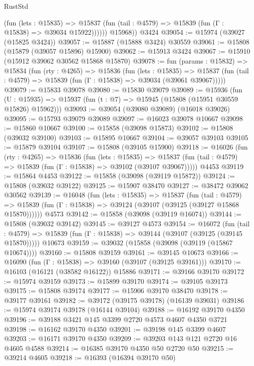 \begin{lexlean}{RustStd}
\begin{coremodule}
              (fun (lets : @15835) =>
              @15837 (fun (tail : @4579) => @15839 (fun (Γ : @15838) => @39034 @15922))))))
        @15968))
    @3424
@39054 := @15974 (@39027 (@15825 @3424))
@39057 := @15887 (@15888 @3424) @30559
@39061 := @15808 (@15879 (@39057 @15896) @15900)
@39062 := @15913 @3424
@39067 := @15910 (@15912 @39062 @30562 @15868 @15870)
@39078 := fun (params : @15832) =>
  @15834
    (fun (rty : @4265) =>
    @15836
      (fun (lets : @15835) =>
      @15837 (fun (tail : @4579) => @15839 (fun (Γ : @15838) => @39034 (@39061 @39067)))))
@39079 := @15833 @39078
@39080 := @15830 @39079
@39089 := @15936
    (fun (U : @15935) => @15937 (fun (t : @7) => @15945 (@15808 (@15951 @30559 @15826) @15962)))
@39093 := @39054 (@39080 @39089) (@16018 @39026)
@39095 := @15793 @39079 @39089
@39097 := @16023 @39078 @10667
@39098 := @15860 @10667
@39100 := @15858 (@39098 @15873)
@39102 := @15808 (@39032 @39100)
@39103 := @15895 @10667
@39104 := @39057 @39103
@39105 := @15879 @39104
@39107 := @15808 (@39105 @15900)
@39118 := @16026
    (fun (rty : @4265) =>
    @15836
      (fun (lets : @15835) =>
      @15837 (fun (tail : @4579) => @15839 (fun (Γ : @15838) => @39102 (@39107 @39067)))))
    @4453
@39119 := @15864 @4453
@39122 := @15858 (@39098 (@39119 @15872))
@39124 := @15808 (@39032 @39122)
@39125 := @15907 @38470
@39127 := @38472 @39062 @30562
@39139 := @16048
    (fun (lets : @15835) =>
    @15837
      (fun (tail : @4579) =>
      @15839 (fun (Γ : @15838) => @39124 (@39107 (@39125 (@39127 @15868 @15870))))))
    @4573
@39142 := @15858 (@39098 (@39119 @16074))
@39144 := @15808 (@39032 @39142)
@39145 := @39127 @4573
@39154 := @16072
    (fun (tail : @4579) => @15839 (fun (Γ : @15838) => @39144 (@39107 (@39125 (@39145 @15870)))))
    @10673
@39159 := @39032 (@15858 (@39098 (@39119 (@15867 @10674))))
@39160 := @15808 @39159
@39161 := @39145 @10673
@39166 := @16090 (fun (Γ : @15838) => @39160 (@39107 (@39125 @39161)))
@39170 := @16103 (@16121 (@38582 @16122)) @15886
@39171 := @39166 @39170
@39172 := @15974 @39159
@39173 := @15899 @39170
@39174 := @39105 @39173
@39175 := @15808 @39174
@39177 := @15906 @39170 @38470
@39178 := @39177 @39161
@39182 := @39172 (@39175 @39178) (@16139 @39031)
@39186 := @15974 @39174 @39178 (@16144 @39104)
@39188 := @16192 @39170 @4350
@39196 := @39188 @3421 @145 @3399 @2720 @4573 @4607 @4350 @3721
@39198 := @16162 @39170 @4350
@39201 := @39198 @145 @3399 @4607
@39203 := @16171 @39170 @4350
@39209 := @39203 @143 @121 @2720 @16 @4605 @4588
@39214 := @16385 @39170 @4350 @50 @2720 @50
@39215 := @39214 @4605
@39218 := @16393 (@16394 @39170 @50)

\end{coremodule}
\end{lexlean}
